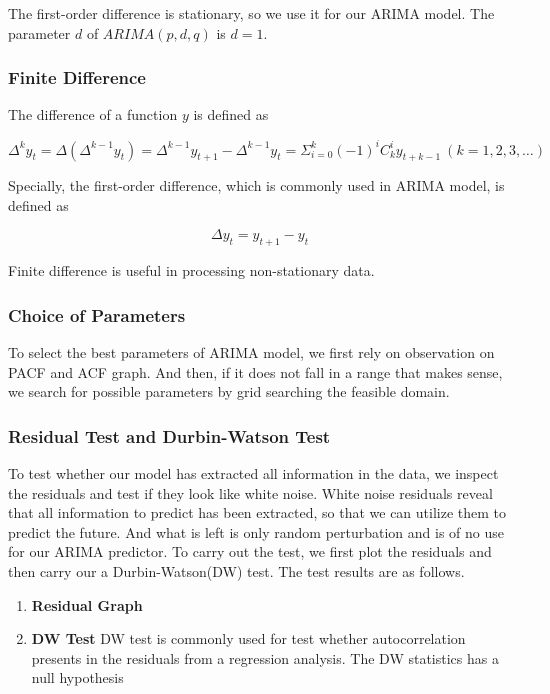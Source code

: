 \documentclass[12pt,a4paper]{article}
\newcommand{\Predictor}{ARIMA }
\begin{document}
\begin{spacing}{1.2}
The first-order difference is stationary, so we use it for our ARIMA model. The parameter $d$ of $ARIMA(p,d,q)$ is $d=1$.

\subsubsection{Finite Difference}

The difference of a function $y$ is defined as

$$
\Delta^k y_t = \Delta(\Delta^{k-1}y_t)=\Delta^{k-1}y_{t+1}-\Delta^{k-1}y_t=\Sigma_{i=0}^k(-1)^i C_k^iy_{t+k-1} \ (k=1,2,3,\dots)
$$

Specially, the first-order difference, which is commonly used in \Predictor model, is defined as

$$
\Delta y_t = y_{t+1} - y_{t}
$$

Finite difference is useful in processing non-stationary data.

\subsubsection{Choice of Parameters}

To select the best parameters of ARIMA model, we first rely on observation on PACF and ACF graph. And then, if it does not fall in a range that makes sense, we search for possible parameters by grid searching the feasible domain.

\subsubsection{Residual Test and Durbin-Watson Test}
To test whether our model has extracted all information in the data, we inspect the residuals and test if they look like white noise. White noise residuals reveal that all information to predict has been extracted, so that we can utilize them to predict the future. And what is left is only random perturbation and is of no use for our \Predictor predictor. To carry out the test, we first plot the residuals and then carry our a Durbin-Watson(DW) test. The test results are as follows.

\begin{enumerate}
	\item \textbf{Residual Graph}
	
	\item \textbf{DW Test}
	DW test is commonly used for test whether autocorrelation presents in the residuals from a regression analysis. The DW statistics has a null hypothesis
	

\end{enumerate}
\end{spacing}
\end{document}
